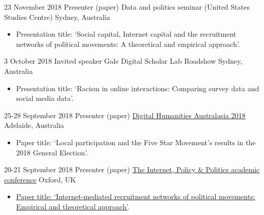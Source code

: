 \documentclass[11pt,a4paper,sans]{moderncv}
\begin{document}
    \cventry
       {23 November 2018} %
    {Presenter (paper)} %
    {Data and politics seminar (United States Studies Centre)} %
    {Sydney, Australia} %
 {}
    {
      \begin{itemize} %
        \item {Presentation title: `Social capital, Internet capital and the recruitment networks of political movements: A theoretical and empirical approach'.}
      \end{itemize}
    }

  
    \cventry
      {3 October 2018} %
    {Invited speaker} %
    {Gale Digital Scholar Lab Roadshow} %
    {Sydney, Australia} %
  {}
    {
      \begin{itemize} %
        \item {Presentation title: `Racism in online interactions: Comparing survey data and social media data'.}
      \end{itemize}
    }

    \cventry
        {25-28 September 2018} %
    {Presenter (paper)} %
    {\href{http://dha-2018.p.dha2018.currinda.com/days/2018-09-28}{Digital Humanities Australasia 2018}} %
    {Adelaide, Australia} %
{}
    {
      \begin{itemize} %
        \item {Paper title: `Local participation and the Five Star Movement’s results in the 2018 General Election'.}
      \end{itemize}
    }


    \cventry
        {20-21 September 2018} %
    {Presenter (paper)} %
    {\href{http://blogs.oii.ox.ac.uk/policy/ipp-conference/papers/}{The Internet, Policy \& Politics academic conference}} %
    {Oxford, UK} %
{}
    {
      \begin{itemize} %
        \item {\href{http://blogs.oii.ox.ac.uk/policy/wp-content/uploads/sites/77/2018/09/IPP2018-Bailo.pdf}{Paper title: `Internet-mediated recruitment networks of political movements: Empirical and theoretical approach'}.}
      \end{itemize}
    }
\end{document}
